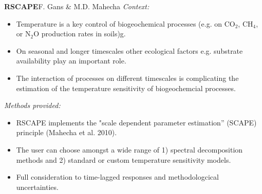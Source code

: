 
{\textbf{RSCAPE}\hfill\normalsize{F. Gans \& M.D. Mahecha}}
\alert{\textit{Context:}}
\begin{itemize}
	\item Temperature is a key control of biogeochemical processes (e.g. on CO$_2$, CH$_4$, or N$_2$O production rates in soils)g.
	\item On seasonal and longer timescales other ecological factors e.g. substrate availability play an important role.
	\item The interaction of processes on different timescales is complicating the estimation of the temperature sensitivity of biogeochemcial processes.
\end{itemize}
 
\alert{\textit{Methods provided:}}
\begin{itemize}
	\item RSCAPE implements the "scale dependent parameter estimation” (SCAPE) principle (Mahecha et al. 2010).
    \item The user can choose amongst a wide range of 1) spectral decomposition methods and 2) standard or custom temperature sensitivity models.
    \item Full consideration to time-lagged responses and methodologcical uncertainties.
\end{itemize}
\vspace{1cm}
